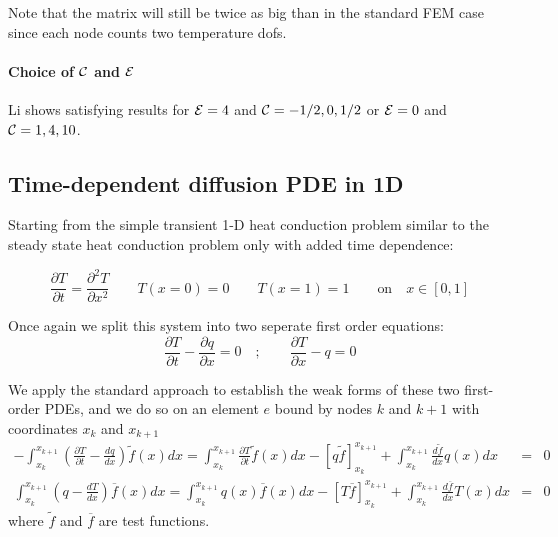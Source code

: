 Note that the matrix will still be twice as big than in the standard FEM case since 
each node counts two temperature dofs. 


\paragraph{Choice of ${\cal C}$ and ${\cal E}$} Li \cite{li06}
shows satisfying results for ${\cal E}=4$ and ${\cal C}=-1/2,0,1/2$ or 
${\cal E}=0$ and ${\cal C}=1,4,10$.







\newpage
\subsection{Time-dependent diffusion PDE in 1D}

Starting from the simple transient 1-D heat conduction problem similar to the 
steady state heat conduction problem only with added time dependence:

\begin{equation}
\frac{\partial T}{\partial t}=\frac{\partial^2T}{\partial x^2} \qquad T(x=0)=0 \qquad T(x=1)=1 \qquad \text{on} \quad x\in[0,1]
\end{equation}


Once again we split this system into two seperate first order equations:
\begin{equation}
\frac{\partial T}{\partial t}-\frac{\partial q}{\partial x}=0 \quad;\qquad \frac{\partial T}{\partial x} -q =0
\end{equation}

We apply the standard approach to establish the weak forms of these two first-order PDEs, and we do so 
on an element $e$ bound by nodes $k$ and $k+1$ with coordinates $x_k$ and $x_{k+1}$
\begin{eqnarray}
-\int_{x_k}^{x_{k+1}} \left( \frac{\partial T}{\partial t}- \frac{dq}{dx} \right) \tilde{f}(x) dx =
\int_{x_k}^{x_{k+1}} \frac{\partial T}{\partial t} \tilde{f}(x)dx
 -\left[q \tilde{f} \right]_{x_k}^{x_{k+1}} 
+ \int_{x_k}^{x_{k+1}} \frac{d\tilde{f}}{dx} q(x) dx &=& 0
\label{eq:dg1}\\
\int_{x_k}^{x_{k+1}}  \left( q-\frac{dT}{dx} \right) \overline{f}(x) dx
=
\int_{x_k}^{x_{k+1}}  q(x) \overline{f}(x) dx
-\left[ T \overline{f}  \right]_{x_k}^{x_{k+1}} + \int_{x_k}^{x_{k+1}} \frac{d\overline{f}}{dx} T(x) dx 
&=& 0
\label{eq:dg2}
\end{eqnarray}
where $\tilde{f}$ and $\overline{f}$ are test functions.


